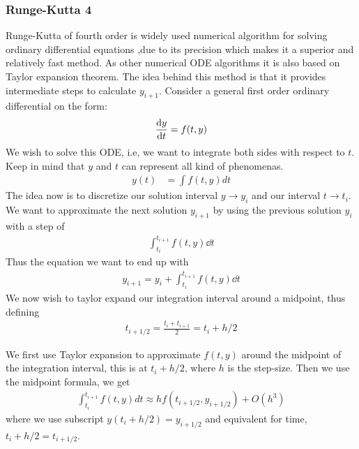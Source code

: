 \documentclass[a4paper, 10pt]{article}
\begin{document}
\subsubsection{Runge-Kutta 4}
Runge-Kutta of fourth order is widely used numerical algorithm for solving ordinary differential equations
,due to its precision which makes it a superior and relatively fast method. As other numerical ODE algorithms it is also based on Taylor expansion theorem.
The idea behind this method is that it provides intermediate steps to calculate
$y_{i+1}$.
Consider a general first order ordinary differential on the form:
\begin{align}
  \dv{y}{t} = f(t,y)
\end{align}
We wish to solve this ODE, i.e, we want to integrate both sides with respect to $t$.
Keep in mind that $y$ and $t$ can represent all kind of phenomenas.
\begin{align}
  y(t) &= \int f(t,y) dt
\end{align}
The idea now is to discretize our solution interval $y \to y_{i}$ and our interval $t \to t_{i}$.
We want to approximate the next solution $y_{i+1}$ by using the previous solution $y_{i}$ with a
step of
\begin{align}
  \int_{t_{i}}^{t_{i+1}}f(t,y)\dd{t}
\end{align}
Thus the equation we want to end up with
\begin{align}
  y_{i+1} = y_{i} + \int_{t_{i}}^{t_{i+1}}f(t,y)\dd{t}
\end{align}
We now wish to taylor expand our integration interval around a midpoint, thus defining
\begin{align}
  t_{i+1/2} = \frac{t_{i} + t_{i+1}}{2} = t_{i} + h/2
\end{align}








\newpage
 We first use Taylor expansion to approximate $f(t,y)$ around the midpoint of
 the integration interval, this is at $t_{i}+ h/2$, where $h$ is the step-size.
 Then we use the midpoint formula, we get
 \begin{align*}
   \int_{t_{i}}^{t_{i+1}} f(t,y) dt \approx h f(t_{i+1/2}, y_{i+1/2}) + O(h^{3})
 \end{align*}
 where we use subscript $y(t_{i}+h/2) = y_{i+1/2}$ and equivalent for time,
 $t_{i} + h/2 = t_{i+1/2}$.
\end{document}
